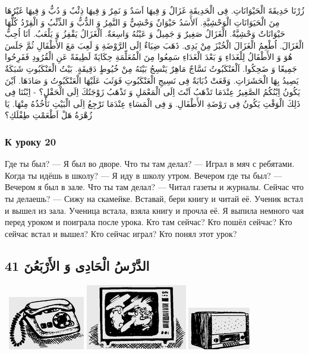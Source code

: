 \documentclass[a5paper]{article}
\begin{document}
زُرْنَا حَدِيقَةَ الْحَيْوَانَاتِ. فِى الْحَدِيقَةِ غَزَالٌ وَ فِيهَا اَسَدٌ وَ نَمِرٌ وَ فِيهَا ذِئْبٌ وَ دُبٌّ وَ فِيهَا غَيْرُهَا مِنَ الْحَيَوَانَاتِ الْوَحْشِيَّةِ. اَلأَسَدُ حَيْوَانٌ وَحْشِيٌّ وَ النَّمِرُ وَ الدُّبُّ وَ الذِّئْبُ وَ الْقِرْدُ كُلُّهَا حَيْوَانَاتٌ وَحْشِيَّةٌ. الْغَزَالُ صَغِيرٌ وَ جَمِيلٌ وَ عَيْنُهُ وَاسِعَةٌ. اَلْغَزَالُ يَقْفِزُ وَ يَلْعَبُ. اَنَا اُحِبُّ الْغَزَالَ. اُطْعِمُ الْغَزَالَ الْخُبْزَ مِنْ يَدِى. ذَهَبَ ضِيَاءٌ اِلَى الرَّوْضَةِ وَ لَعِبَ مَعَ الأَطْفَالِ ثُمَّ جَلَسَ هُوَ وَ الأَطْفَالُ لِلْغَدَاءِ وَ بَعْدَ الْغَدَاءِ سَمِعُوا مِنَ الْمُعَلِّمَةِ حِكَايَةً لَطِيفَةً عَنِ الْقُرُودِ فَفَرِحُوا جَمِيعًا وَ ضَحِكُوا. اَلْعَنْكَبُوتُ نَسَّاجٌ مَاهِرٌ يَنْسِجُ بَيْتَهُ مِنْ خُيُوطٍ دَقِيقَةٍ. بَيْتُ الْعَنْكَبُوتِ شَبَكَةٌ يَصِيدُ بِهَا الْحَشَرَاتِ. وَقَعَتْ ذُبَابَةٌ فِى نَسِيجِ الْعَنْكَبُوتِ فَوَثَبَ عَلَيْهَا الْعَنْكَبُوتُ وَ صَادَهَا. اَيْنَ يَكُونُ اِبْنُكُمُ الصَّغِيرُ عِنْدَمَا تَذْهَبُ اَنْتَ اِلَى الْمَعْمَلِ وَ تَذْهَبُ زَوْجَتُكَ اِلَى الْحَقْلِ؟ - اِبْنُنَا فِى ذَلِكَ الْوَقْتِ يَكُونُ فِى رَوْضَةِ الأَطْفَالِ. وَ فِى الْمَسَاءِ عِنْدَمَا نَرْجِعُ اِلَى الْبَيْتِ نَأْخُذُهُ مِنْهَا. يَا زُهْرَةُ هَلْ اَطْعَمْتِ طِفْلَكِ؟

\subsubsection{К уроку 20}
Где ты был? — Я был во дворе. Что ты там делал? — Играл в мяч с ребятами. Когда ты идёшь в школу? — Я иду в школу утром. Вечером где ты был? — Вечером я был в зале. Что ты там де­лал? — Читал газеты и журналы. Сейчас что ты делаешь? — Сижу на скамейке. Вставай, бери книгу и читай её. Ученик встал и вышел из зала. Ученица встала, взяла книгу и прочла её. Я выпила немного чая перед уроком и поиграла после урока. Кто там сейчас? Кто пошёл сейчас? Кто сейчас встал и вышел? Кто сейчас играл? Кто понял этот урок?

\subsection{الدَّرْسُ الْحَادِى وَ الأَرْبَعُنَ 41}
\  \includegraphics[width=1.3126in,height=0.9165in]{images/MuhammadBagauddinprettified-img122.png}   \includegraphics[width=1.7398in,height=1.1252in]{images/MuhammadBagauddinprettified-img123.png}   \includegraphics[width=1.0728in,height=0.7291in]{images/MuhammadBagauddinprettified-img124.png} 
\end{document}
